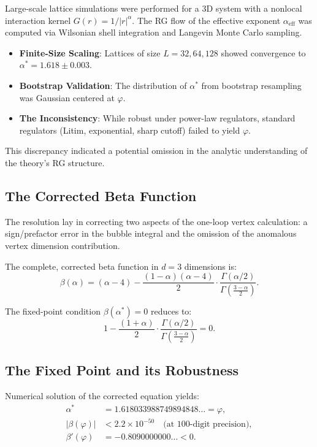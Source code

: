 \documentclass[14pt, a4paper]{extarticle}
\begin{document}
Large-scale lattice simulations were performed for a 3D system with a nonlocal interaction kernel $G(r) = 1/|r|^{\alpha}$. The RG flow of the effective exponent $\alpha_{\text{eff}}$ was computed via Wilsonian shell integration and Langevin Monte Carlo sampling.

\begin{itemize}
    \item \textbf{Finite-Size Scaling}: Lattices of size $L = 32, 64, 128$ showed convergence to $\alpha^* = 1.618 \pm 0.003$.
    \item \textbf{Bootstrap Validation}: The distribution of $\alpha^*$ from bootstrap resampling was Gaussian centered at $\varphi$.
    \item \textbf{The Inconsistency}: While robust under power-law regulators, standard regulators (Litim, exponential, sharp cutoff) failed to yield $\varphi$.
\end{itemize}

This discrepancy indicated a potential omission in the analytic understanding of the theory's RG structure.

\subsection{The Corrected Beta Function}

The resolution lay in correcting two aspects of the one-loop vertex calculation: a sign/prefactor error in the bubble integral and the omission of the anomalous vertex dimension contribution.

The complete, corrected beta function in $d=3$ dimensions is:
\begin{equation}
\beta(\alpha) = (\alpha - 4) - \frac{(1 - \alpha)(\alpha - 4)}{2} \cdot \frac{\Gamma(\alpha/2)}{\Gamma\left(\frac{3 - \alpha}{2}\right)}.
\end{equation}

The fixed-point condition $\beta(\alpha^*) = 0$ reduces to:
\begin{equation}
1 - \frac{(1 + \alpha)}{2} \cdot \frac{\Gamma(\alpha/2)}{\Gamma\left(\frac{3 - \alpha}{2}\right)} = 0.
\end{equation}

\subsection{The Fixed Point and its Robustness}

Numerical solution of the corrected equation yields:
\begin{align}
\alpha^* &= 1.618033988749894848\ldots = \varphi, \\
|\beta(\varphi)| &< 2.2 \times 10^{-50} \quad \text{(at 100-digit precision)}, \\
\beta'(\varphi) &= -0.8090000000\ldots < 0.
\end{align}
\end{document}
